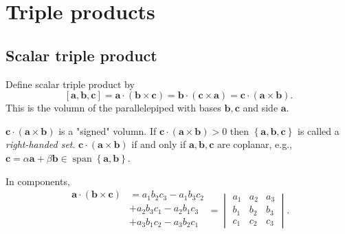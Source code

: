\documentclass[10pt]{article}
\DeclareMathOperator{\spn}{span}
\begin{document}
    \section{Triple products}
    \subsection{Scalar triple product}
    \begin{definition}
        Define scalar triple product by
        \[
            [\mathbf{a},\mathbf{b},\mathbf{c}]=\mathbf{a}\cdot (\mathbf{b} \times \mathbf{c})=\mathbf{b}\cdot (\mathbf{c} \times \mathbf{a})=\mathbf{c}\cdot (\mathbf{a}\times \mathbf{b})
        .\]
        This is the volumn of the parallelepiped with bases $ \mathbf{b}, \mathbf{c} $ and side $ \mathbf{a} .$
    \end{definition}
    \begin{remark}
        $ \mathbf{c}\cdot (\mathbf{a}\times \mathbf{b}) $ is a "signed" volumn. If $ \mathbf{c}\cdot (\mathbf{a}\times \mathbf{b})>0 $ then $ \left\{ \mathbf{a},\mathbf{b},\mathbf{c}\right\} $ is called a \textit{right-handed set}. $ \mathbf{c}\cdot (\mathbf{a}\times \mathbf{b}) $ if and only if $ \mathbf{a},\mathbf{b},\mathbf{c} $ are coplanar, e.g., $ \mathbf{c}=\alpha \mathbf{a}+\beta \mathbf{b} \in \spn\left\{ \mathbf{a},\mathbf{b}\right\}$.
    \end{remark}
    In components, 
    \[
        \begin{aligned}
            \mathbf{a}\cdot (\mathbf{b}\times \mathbf{c})&=a_1b_2c_3-a_1b_3c_2 \\
            &+a_2b_3c_1-a_2b_1c_3\\
            &+a_3b_1c_2-a_3b_2c_1\\
        \end{aligned} =\begin{vmatrix}
            a_{1} & a_{2} & a_{3} \\
            b_{1} & b_{2} & b_{3} \\
            c_{1} & c_{2} & c_{3}
        \end{vmatrix}.
    \]
\end{document}
